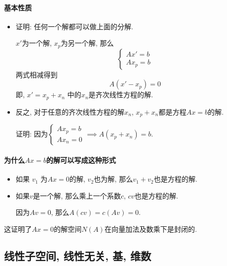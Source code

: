\paragraph{基本性质}
\begin{itemize}
    \item 证明: 任何一个解都可以做上面的分解.

    $x'$为一个解, $x_p$为另一个解, 那么
    \begin{equation}
      \begin{cases} 
        Ax' = b
        \\ 
        A x_p = b 
      \end{cases}
    \end{equation}
    两式相减得到
    \begin{equation}
      A(x' -x_p)=0
    \end{equation}
    即, $x' = x_p +x_n$ 中的$x_n$是齐次线性方程的解.

    \item 反之, 对于任意的齐次线性方程的解$x_n$, $x_p + x_n$都是方程$Ax=b$的解.

    证明: 
    因为$\begin{cases} 
      A x_p=b 
      \\ 
      A x_n=0 
    \end{cases}
    \implies A(x_p+ x_n) = b$.
    
\end{itemize}

\paragraph{为什么$Ax=b$的解可以写成这种形式}

\begin{itemize}
    \item 如果 $v_1$ 为$Ax=0$的解, $v_2$也为解, 那么$v_1+v_2$也是方程的解.
    
    \item 如果$v$是一个解, 那么乘上一个系数$c$, $cv$也是方程的解.

    因为$Av=0$, 那么$A (cv) = c (Av) = 0$.
\end{itemize}

这证明了$Ax=0$的解空间$N(A)$在向量加法及数乘下是封闭的.

\subsection[一些概念]{线性子空间, 线性无关, 基, 维数}

